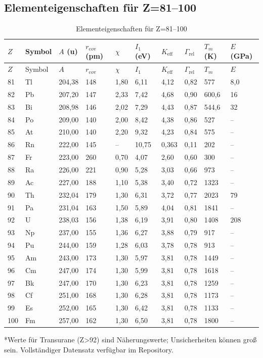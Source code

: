 \documentclass[12pt,a4paper]{article}
\newcommand{\Keff}{K_{\mathrm{eff}}}
\begin{document}
	\subsection*{Elementeigenschaften für Z=81–100}
	
	\begin{longtable}{p{0.6cm}p{1.2cm}p{1.2cm}p{1.2cm}p{1.2cm}p{1.2cm}p{1.5cm}p{1.2cm}p{1.2cm}p{1.2cm}}
		\caption{Elementeigenschaften für Z=81–100} \label{tab:elem-data-81to100} \\
		\toprule
		\(Z\) & Symbol & \(A\) (u) & \(r_{\text{cov}}\) (pm) & \(\chi\) & \(I_1\) (eV) & \(\Keff\) & \(\Gamma_{\text{rel}}\) & \(T_m\) (K) & \(E\) (GPa) \\
		\midrule
		\endfirsthead
		\toprule
		\(Z\) & Symbol & \(A\) & \(r_{\text{cov}}\) & \(\chi\) & \(I_1\) & \(\Keff\) & \(\Gamma_{\text{rel}}\) & \(T_m\) & \(E\) \\
		\midrule
		\endhead
		81 & Tl & 204,38 & 148 & 1,80 & 6,11 & 4,12 & 0,82 & 577 & 8,0 \\
		82 & Pb & 207,20 & 147 & 2,33 & 7,42 & 4,68 & 0,90 & 600,6 & 16 \\
		83 & Bi & 208,98 & 146 & 2,02 & 7,29 & 4,43 & 0,87 & 544,6 & 32 \\
		84 & Po & 209,00 & 140 & 2,00 & 8,42 & 4,38 & 0,86 & 527 & – \\
		85 & At & 210,00 & 140 & 2,20 & 9,32 & 4,23 & 0,84 & 575 & – \\
		86 & Rn & 222,00 & 145 & –    & 10,75 & 0,363 & 0,11 & 202 & – \\
		87 & Fr & 223,00 & 260 & 0,70 & 4,07 & 2,60 & 0,60 & 300 & – \\
		88 & Ra & 226,00 & 221 & 0,90 & 5,28 & 3,03 & 0,66 & 973 & – \\
		89 & Ac & 227,00 & 188 & 1,10 & 5,38 & 3,40 & 0,72 & 1323 & – \\
		90 & Th & 232,04 & 179 & 1,30 & 6,31 & 3,72 & 0,77 & 2023 & 79 \\
		91 & Pa & 231,04 & 163 & 1,50 & 5,89 & 4,04 & 0,81 & 1841 & – \\
		92 & U  & 238,03 & 156 & 1,38 & 6,19 & 3,91 & 0,80 & 1408 & 208 \\
		93 & Np & 237,00 & 155 & 1,36 & 6,27 & 3,88 & 0,79 & 917 & – \\
		94 & Pu & 244,00 & 159 & 1,28 & 6,03 & 3,78 & 0,78 & 913 & – \\
		95 & Am & 243,00 & 173 & 1,30 & 5,97 & 3,81 & 0,78 & 1449 & – \\
		96 & Cm & 247,00 & 174 & 1,30 & 5,99 & 3,81 & 0,78 & 1618 & – \\
		97 & Bk & 247,00 & 170 & 1,30 & 6,23 & 3,81 & 0,78 & 1259 & – \\
		98 & Cf & 251,00 & 168 & 1,30 & 6,28 & 3,81 & 0,78 & 1173 & – \\
		99 & Es & 252,00 & 165 & 1,30 & 6,42 & 3,81 & 0,78 & 1133 & – \\
		100& Fm & 257,00 & 162 & 1,30 & 6,50 & 3,81 & 0,78 & 1800 & – \\
		\bottomrule
	\end{longtable}
	*Werte für Transurane (Z>92) sind Näherungswerte; Unsicherheiten können groß sein. Vollständiger Datensatz verfügbar im Repository.
	
\end{document}

